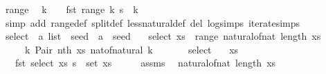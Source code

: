 \begin{isabellebody}
\isanewline
{}\isamarkupfalse%
\ range{\isacharcolon}{\kern0pt}\isanewline
\ \ {\isachardoublequoteopen}k\ {\isachargreater}{\kern0pt}\ {}\ {\isasymLongrightarrow}\ fst\ {\isacharparenleft}{\kern0pt}range\ k\ s{\isacharparenright}{\kern0pt}\ {\isacharless}{\kern0pt}\ k{\isachardoublequoteclose}\isanewline
%
\isadelimproof
\ \ %
\endisadelimproof
%
\isatagproof
{}\isamarkupfalse%
\ {\isacharparenleft}{\kern0pt}simp\ add{\isacharcolon}{\kern0pt}\ range{\isacharunderscore}{\kern0pt}def\ split{\isacharunderscore}{\kern0pt}def\ less{\isacharunderscore}{\kern0pt}natural{\isacharunderscore}{\kern0pt}def\ del{\isacharcolon}{\kern0pt}\ log{\isachardot}{\kern0pt}simps\ iterate{\isachardot}{\kern0pt}simps{\isacharparenright}{\kern0pt}%
\endisatagproof
{\isafoldproof}%
%
\isadelimproof
\isanewline
%
\endisadelimproof
\isanewline
{}\isamarkupfalse%
\ select\ {\isacharcolon}{\kern0pt}{\isacharcolon}{\kern0pt}\ {\isachardoublequoteopen}{\isacharprime}{\kern0pt}a\ list\ {\isasymRightarrow}\ seed\ {\isasymRightarrow}\ {\isacharprime}{\kern0pt}a\ {\isasymtimes}\ seed{\isachardoublequoteclose}\ \isanewline
\ \ {\isachardoublequoteopen}select\ xs\ {\isacharequal}{\kern0pt}\ range\ {\isacharparenleft}{\kern0pt}natural{\isacharunderscore}{\kern0pt}of{\isacharunderscore}{\kern0pt}nat\ {\isacharparenleft}{\kern0pt}length\ xs{\isacharparenright}{\kern0pt}{\isacharparenright}{\kern0pt}\isanewline
\ \ \ \ {\isasymcirc}{\isasymrightarrow}\ {\isacharparenleft}{\kern0pt}{\isasymlambda}k{\isachardot}{\kern0pt}\ Pair\ {\isacharparenleft}{\kern0pt}nth\ xs\ {\isacharparenleft}{\kern0pt}nat{\isacharunderscore}{\kern0pt}of{\isacharunderscore}{\kern0pt}natural\ k{\isacharparenright}{\kern0pt}{\isacharparenright}{\kern0pt}{\isacharparenright}{\kern0pt}{\isachardoublequoteclose}\isanewline
\ \ \ \ \ \isanewline
{}\isamarkupfalse%
\ select{\isacharcolon}{\kern0pt}\isanewline
\ \ \ {\isachardoublequoteopen}xs\ {\isasymnoteq}\ {\isacharbrackleft}{\kern0pt}{\isacharbrackright}{\kern0pt}{\isachardoublequoteclose}\isanewline
\ \ \ {\isachardoublequoteopen}fst\ {\isacharparenleft}{\kern0pt}select\ xs\ s{\isacharparenright}{\kern0pt}\ {\isasymin}\ set\ xs{\isachardoublequoteclose}\isanewline
%
\isadelimproof
%
\endisadelimproof
%
\isatagproof
{}\isamarkupfalse%
\ {\isacharminus}{\kern0pt}\isanewline
\ \ \isamarkupfalse%
\ assms\ \isamarkupfalse%
\ {\isachardoublequoteopen}natural{\isacharunderscore}{\kern0pt}of{\isacharunderscore}{\kern0pt}nat\ {\isacharparenleft}{\kern0pt}length\ xs{\isacharparenright}{\kern0pt}\ {\isachargreater}{\kern0pt}\ {}{\isachardoublequoteclose}\ \isamarkupfalse%

\end{isabellebody}
